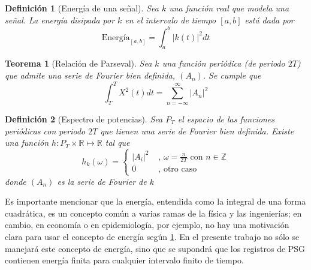 \documentclass[12pt,a4paper]{mitthesis}
\newtheorem{defn}{Definici\'on}
\newtheorem{thrm}{Teorema}
\newcommand{\abso}[1]{\left| #1 \right|}
\begin{document}
\begin{defn}[Energ\'ia de una se\~nal]
Sea $k$ una funci\'on real que modela una se\~nal. La energ\'ia disipada por $k$ en el intervalo de
tiempo $[a,b]$ est\'a dada por
\begin{equation*}
\text{Energ\'ia}_{[a,b]} = \int_{a}^{b} \abso{k\left(t\right)}^{2} dt
\end{equation*}
\label{energia}
\end{defn}

\begin{thrm}[Relaci\'on de Parseval]
Sea $k$ una funci\'on peri\'odica (de periodo $2T$) que admite una serie de Fourier bien definida,
$(A_n)$. Se cumple que
\begin{equation*}
\int_T^{T} X^{2}(t) dt = \sum_{n=-\infty}^{\infty} \abso{A_n}^{2}
\end{equation*}
\label{parseval_serie}
\end{thrm}

\begin{defn}[Espectro de potencias]
Sea $P_T$ el espacio de las funciones peri\'odicas con periodo $2T$ que tienen una serie de Fourier 
bien definida. Existe una funci\'on $h: P_T \times \mathbb{R} \mapsto \mathbb{R}$ tal que
\begin{equation*}
h_k(\omega) = 
\begin{cases}
\abso{A_i}^{2} & \text{ , } \omega = \frac{n}{2T} \text{  con } n\in \mathbb{Z} \\
0 & \text{ ,  otro caso}
\end{cases}
\end{equation*}
donde $\left( A_n \right)$ es la serie de Fourier de $k$
\label{espec}
\end{defn}

Es importante mencionar que la energ\'ia, entendida como la integral de una forma cuadr\'atica, es 
un concepto com\'un a varias ramas de la f\'isica y las ingenier\'ias; en cambio, en econom\'ia o 
en epidemiolog\'ia, por ejemplo, no hay una motivaci\'on clara para usar el concepto de energ\'ia 
seg\'un \ref{energia}.
En el presente trabajo no s\'olo se manejar\'a este concepto de energ\'ia, sino que se supondr\'a
que los registros de PSG contienen energ\'ia finita para cualquier intervalo finito de tiempo.
\end{document}
